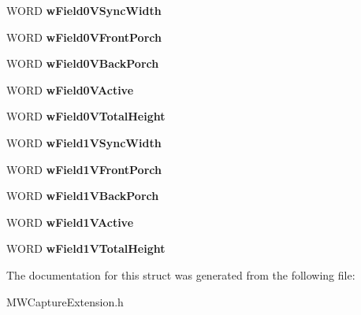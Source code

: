 \begin{DoxyCompactItemize}
\item 
\hypertarget{struct__MWCAP__HDMI__VIDEO__TIMING_a7873d2af5e3eefc243ac4ceef6594933}{W\-O\-R\-D {\bfseries w\-Field0\-V\-Sync\-Width}}\label{struct__MWCAP__HDMI__VIDEO__TIMING_a7873d2af5e3eefc243ac4ceef6594933}

\item 
\hypertarget{struct__MWCAP__HDMI__VIDEO__TIMING_abd19666b05ee39afa610812a70113349}{W\-O\-R\-D {\bfseries w\-Field0\-V\-Front\-Porch}}\label{struct__MWCAP__HDMI__VIDEO__TIMING_abd19666b05ee39afa610812a70113349}

\item 
\hypertarget{struct__MWCAP__HDMI__VIDEO__TIMING_aabd5662dfbe54e5824c2737203ac73ad}{W\-O\-R\-D {\bfseries w\-Field0\-V\-Back\-Porch}}\label{struct__MWCAP__HDMI__VIDEO__TIMING_aabd5662dfbe54e5824c2737203ac73ad}

\item 
\hypertarget{struct__MWCAP__HDMI__VIDEO__TIMING_a57ad665f38702e3b4254899cb9e73aff}{W\-O\-R\-D {\bfseries w\-Field0\-V\-Active}}\label{struct__MWCAP__HDMI__VIDEO__TIMING_a57ad665f38702e3b4254899cb9e73aff}

\item 
\hypertarget{struct__MWCAP__HDMI__VIDEO__TIMING_a12fc74a5335486a6f70dc74ea1d5af02}{W\-O\-R\-D {\bfseries w\-Field0\-V\-Total\-Height}}\label{struct__MWCAP__HDMI__VIDEO__TIMING_a12fc74a5335486a6f70dc74ea1d5af02}

\item 
\hypertarget{struct__MWCAP__HDMI__VIDEO__TIMING_a0152e71b576f7e6736b631a03988bad7}{W\-O\-R\-D {\bfseries w\-Field1\-V\-Sync\-Width}}\label{struct__MWCAP__HDMI__VIDEO__TIMING_a0152e71b576f7e6736b631a03988bad7}

\item 
\hypertarget{struct__MWCAP__HDMI__VIDEO__TIMING_a69fd12d8e50e2d9f65674292c59beb24}{W\-O\-R\-D {\bfseries w\-Field1\-V\-Front\-Porch}}\label{struct__MWCAP__HDMI__VIDEO__TIMING_a69fd12d8e50e2d9f65674292c59beb24}

\item 
\hypertarget{struct__MWCAP__HDMI__VIDEO__TIMING_ada40aff5f7ec50fae51314ab0fd61db1}{W\-O\-R\-D {\bfseries w\-Field1\-V\-Back\-Porch}}\label{struct__MWCAP__HDMI__VIDEO__TIMING_ada40aff5f7ec50fae51314ab0fd61db1}

\item 
\hypertarget{struct__MWCAP__HDMI__VIDEO__TIMING_a42b4e78bfbcddfcd63b53fca9f9c6cc4}{W\-O\-R\-D {\bfseries w\-Field1\-V\-Active}}\label{struct__MWCAP__HDMI__VIDEO__TIMING_a42b4e78bfbcddfcd63b53fca9f9c6cc4}

\item 
\hypertarget{struct__MWCAP__HDMI__VIDEO__TIMING_a2db883829bc00c5d8898da8562209f42}{W\-O\-R\-D {\bfseries w\-Field1\-V\-Total\-Height}}\label{struct__MWCAP__HDMI__VIDEO__TIMING_a2db883829bc00c5d8898da8562209f42}

\end{DoxyCompactItemize}


The documentation for this struct was generated from the following file\-:\begin{DoxyCompactItemize}
\item 
M\-W\-Capture\-Extension.\-h\end{DoxyCompactItemize}
